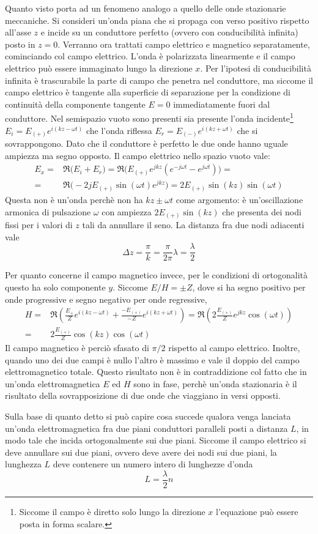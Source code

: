 Quanto visto porta ad un fenomeno analogo a quello delle onde stazionarie meccaniche.
Si consideri un'onda piana che si propaga con verso positivo rispetto all'asse $z$ e incide su un
conduttore perfetto (ovvero con conducibilità infinita) posto in $z=0$.
Verranno ora trattati campo elettrico e magnetico separatamente, cominciando col campo elettrico.
L'onda è polarizzata linearmente e
il campo elettrico può essere immaginato lungo la direzione $x$. Per l'ipotesi di conducibilità
infinita è trascurabile la parte di campo che penetra nel conduttore, ma siccome il campo elettrico
è tangente alla superficie di separazione per la condizione di continuità della componente tangente
$E=0$ immediatamente fuori dal conduttore. Nel semispazio vuoto sono presenti
sia presente l'onda incidente\footnote{Siccome il campo è diretto solo lungo la direzione $x$ l'equazione
può essere posta in forma scalare.} $E_i=E_{(+)}e^{i(kz-\omega t)}$
che l'onda riflessa $E_r=E_{(-)}e^{i(kz+\omega t)}$ che si sovrappongono.
Dato che il conduttore è perfetto le due onde hanno uguale ampiezza ma segno opposto.
Il campo elettrico nello spazio vuoto vale:
\[
    \begin{split}
        E_x=&\Re\bigl(E_i+E_r\bigr)=\Re\bigl(E_{(+)}e^{jkz}(e^{-j\omega t}-e^{j\omega t})\bigr)=\\
        =&\Re\bigl(-2jE_{(+)}\sin(\omega t)e^{jkz}\bigr)=2E_{(+)}\sin(kz)\sin(\omega t)
    \end{split}
\]
Questa non è un'onda perchè non ha $kz\pm\omega t$ come argomento: è un'oscillazione armonica di pulsazione
$\omega$ con ampiezza $2E_{(+)}\sin(kz)$
che presenta dei nodi fissi per i valori di $z$ tali da annullare il seno. La distanza fra due
nodi adiacenti vale
\[
    \Delta z=\frac{\pi}{k}=\frac{\pi}{2\pi}\lambda=\frac{\lambda}{2}
\]

Per quanto concerne il campo magnetico invece, per le condizioni di ortogonalità questo ha solo componente $y$.
Siccome $E/H=\pm Z$, dove si ha segno positivo per onde progressive e segno negativo per onde regressive,
\[
    \begin{split}
        H=&\Re(\frac{E_{+}}{Z}e^{i(kz-\omega t)}+\frac{-E_{(+)}}{-Z}e^{i(kz+\omega t)})=\Re(2\frac{E_{(+)}}{Z}e^{jkz}\cos(\omega t))\\
        =&2\frac{E_{(+)}}{Z}\cos(kz)\cos(\omega t)
    \end{split}
\]
Il campo magnetico è perciò sfasato di $\pi/2$ rispetto al campo elettrico. Inoltre, quando uno dei due campi è
nullo l'altro è massimo e vale il doppio del campo elettromagnetico totale. Questo risultato non è in contraddizione
col fatto che in un'onda elettromagnetica $E$ ed $H$ sono in fase, perchè un'onda stazionaria è il risultato
della sovrapposizione di due onde che viaggiano in versi opposti.

Sulla base di quanto detto si può capire cosa succede qualora venga lanciata un'onda elettromagnetica
fra due piani conduttori paralleli posti a distanza $L$, in modo tale che incida ortogonalmente sui due piani.
Siccome il campo elettrico si deve annullare sui due piani, ovvero deve avere dei nodi sui due piani, la
lunghezza $L$ deve contenere un numero intero di lunghezze d'onda
\[
    L=\frac{\lambda}{2}n
\]
